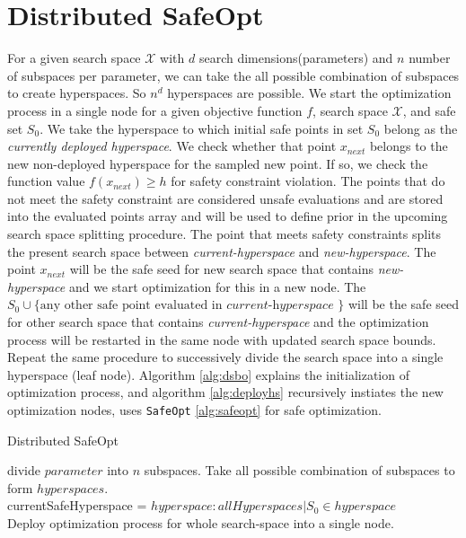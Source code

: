 \section{Distributed SafeOpt}
For a given search space $\mathcal{X}$ with $d$ search dimensions(parameters) and $n$ number of subspaces per parameter, we can take the all possible combination of subspaces to create hyperspaces. So $n^d$ hyperspaces are possible. 
We start the optimization process in a single node for a given objective function $f$, search space $\mathcal{X}$, and safe set $S_0$. 
We take the hyperspace to which initial safe points in set $S_0$ belong as the \textit{currently deployed hyperspace}. 
We check whether that point $x_{next}$ belongs to the new non-deployed hyperspace for the sampled new point. 
If so, we check the function value $f(x_{next}) \geq h$ for safety constraint violation. 
The points that do not meet the safety constraint are considered unsafe evaluations and are stored into the evaluated points array and will be used to define prior in the upcoming search space splitting procedure.
The point that meets safety constraints splits the present search space between \textit{current-hyperspace} and \textit{new-hyperspace}. 
The point $x_{next}$ will be the safe seed for new search space that contains \textit{new-hyperspace} and we start optimization for this in a new node. 
The $S_0 \cup \{ \text{any other safe point evaluated in }\textit{current-hyperspace } \}$ will be the safe seed for other search space that contains \textit{current-hyperspace} and the optimization process will be restarted in the same node with updated search space bounds. 
Repeat the same procedure to successively divide the search space into a single hyperspace (leaf node). Algorithm \ref{alg:dsbo} explains the initialization of optimization process, and algorithm \ref{alg:deployhs} recursively instiates the new optimization nodes, uses \texttt{SafeOpt} \ref{alg:safeopt} for safe optimization.

\begin{algorithm}[h!]
	\caption{Distributed SafeOpt}
	\label{alg:dsbo}
	{
		divide $parameter$ into $n$ subspaces.
	}
	Take all possible combination of subspaces to form $hyperspaces$.\\
	currentSafeHyperspace = $hyperspace : allHyperspaces | S_0 \in hyperspace$\\
	Deploy optimization process for whole search-space into a single node.\\		
\end{algorithm}

